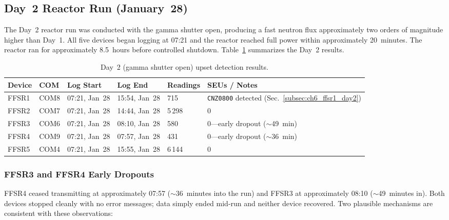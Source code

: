 \subsection{Day~2 Reactor Run (January~28)}
\label{subsec:ch6_day2}

The Day~2 reactor run was conducted with the gamma shutter open,
producing a fast neutron flux approximately two orders of magnitude
higher than Day~1.  All five devices began logging at 07:21 and the
reactor reached full power within approximately 20~minutes.  The reactor
ran for approximately 8.5~hours before controlled shutdown.
Table~\ref{tab:ch6_day2_results} summarizes the Day~2 results.

\begin{table}[htbp]
    \centering
    \caption{Day~2 (gamma shutter open) upset detection results.}
    \label{tab:ch6_day2_results}
    \begin{tabular}{p{1.2cm}lllll}
        \toprule
        \textbf{Device} & \textbf{COM} & \textbf{Log Start}
            & \textbf{Log End} & \textbf{Readings}
            & \textbf{SEUs / Notes} \\
        \midrule
        FFSR1 & COM8 & 07:21, Jan~28 & 15:54, Jan~28 & 715
            & \texttt{CNZ0800} detected (Sec.~\ref{subsec:ch6_ffsr1_day2}) \\
        FFSR2 & COM7 & 07:21, Jan~28 & 14:44, Jan~28 & 5\,298 & 0 \\
        FFSR3 & COM6 & 07:21, Jan~28 & 08:10, Jan~28 & 580
            & 0---early dropout ($\sim$49~min) \\
        FFSR4 & COM9 & 07:21, Jan~28 & 07:57, Jan~28 & 431
            & 0---early dropout ($\sim$36~min) \\
        FFSR5 & COM4 & 07:21, Jan~28 & 15:55, Jan~28 & 6\,144 & 0 \\
        \bottomrule
    \end{tabular}
\end{table}

\subsubsection{FFSR3 and FFSR4 Early Dropouts}

FFSR4 ceased transmitting at approximately 07:57 ($\sim$36~minutes into
the run) and FFSR3 at approximately 08:10 ($\sim$49~minutes in).  Both
devices stopped cleanly with no error messages; data simply ended
mid-run and neither device recovered.  Two plausible mechanisms are
consistent with these observations:

